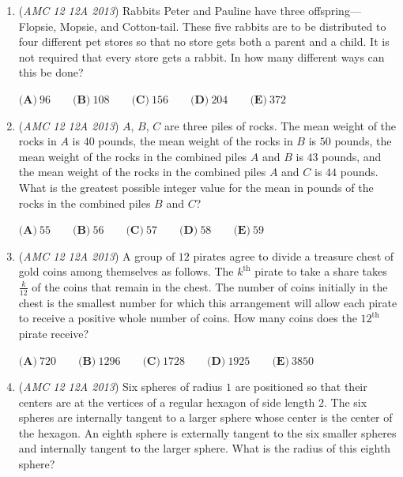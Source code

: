\begin{enumerate}
 $\textbf{(A)} \ 125\sqrt{3} \qquad \textbf{(B)} \ 270 \qquad \textbf{(C)} \ 162\sqrt{5} \qquad \textbf{(D)} \ 434 \qquad \textbf{(E)} \ 225\sqrt{6}$


	\item (\textit{AMC 12 12A 2013}) Rabbits Peter and Pauline have three offspring—Flopsie, Mopsie, and Cotton-tail. These five rabbits are to be distributed to four different pet stores so that no store gets both a parent and a child. It is not required that every store gets a rabbit. In how many different ways can this be done?


 $\textbf{(A)} \ 96 \qquad  \textbf{(B)} \ 108 \qquad  \textbf{(C)} \ 156 \qquad  \textbf{(D)} \ 204 \qquad  \textbf{(E)} \ 372$


	\item (\textit{AMC 12 12A 2013}) $A$, $B$, $C$ are three piles of rocks. The mean weight of the rocks in $A$ is $40$ pounds, the mean weight of the rocks in $B$ is $50$ pounds, the mean weight of the rocks in the combined piles $A$ and $B$ is $43$ pounds, and the mean weight of the rocks in the combined piles $A$ and $C$ is $44$ pounds. What is the greatest possible integer value for the mean in pounds of the rocks in the combined piles $B$ and $C$?


 $\textbf{(A)} \ 55 \qquad \textbf{(B)} \ 56 \qquad \textbf{(C)} \ 57 \qquad \textbf{(D)} \ 58 \qquad \textbf{(E)} \ 59$


	\item (\textit{AMC 12 12A 2013}) A group of $12$ pirates agree to divide a treasure chest of gold coins among themselves as follows. The $k^\text{th}$ pirate to take a share takes $\frac{k}{12}$ of the coins that remain in the chest. The number of coins initially in the chest is the smallest number for which this arrangement will allow each pirate to receive a positive whole number of coins. How many coins does the $12^{\text{th}}$ pirate receive?


 $\textbf{(A)} \ 720 \qquad  \textbf{(B)} \ 1296 \qquad  \textbf{(C)} \ 1728 \qquad  \textbf{(D)} \ 1925 \qquad  \textbf{(E)} \ 3850$


	\item (\textit{AMC 12 12A 2013}) Six spheres of radius $1$ are positioned so that their centers are at the vertices of a regular hexagon of side length $2$. The six spheres are internally tangent to a larger sphere whose center is the center of the hexagon. An eighth sphere is externally tangent to the six smaller spheres and internally tangent to the larger sphere. What is the radius of this eighth sphere?



\end{enumerate}
